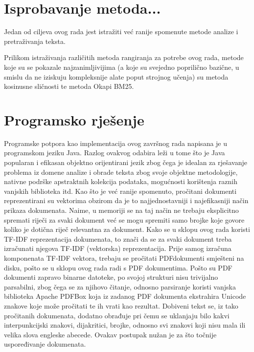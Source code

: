 \documentclass[times, utf8, zavrsni]{fer}
\begin{document}
\chapter{Isprobavanje metoda...}
Jedan od ciljeva ovog rada jest istražiti već ranije spomenute metode analize i pretraživanja teksta.

Prilikom istraživanja različitih metoda rangiranja za potrebe ovog rada, metode koje su se pokazale najzanimljivijima (a koje su svejedno poprilično bazične, u smislu da ne iziskuju kompleksnije alate poput strojnog učenja) su metoda kosinusne sličnosti te metoda Okapi BM25.

\chapter{Programsko rješenje}
\label{chap:impl}
Programske potpora kao implementacija ovog završnog rada napisana je u programskom jeziku Java. Razlog ovakvog odabira leži u tome što je Java popularan i efikasan objektno orijentirani jezik zbog čega je idealan za rješavanje problema iz domene analize i obrade teksta zbog svoje objektne metodologije, nativne podrške apstraktnih kolekcija podataka, mogućnosti korištenja raznih vanjskih biblioteka itd. \newline \newline
Kao što je već ranije spomenuto, pročitani dokumenti reprezentirani su vektorima obzirom da je to najjednostavniji i najefikasniji način prikaza dokumenata. Naime, u memoriji se na taj način ne trebaju eksplicitno spremati riječi za svaki dokument već se mogu spremiti samo brojke koje govore koliko je dotična riječ relevantna za dokument. Kako se u sklopu ovog rada koristi TF-IDF reprezentacija dokumenata, to znači da se za svaki dokument treba izračunati njegova TF-IDF (vektorska) reprezentacija. Prije samog izračuna komponenata TF-IDF vektora, trebaju se pročitati PDFdokumenti smješteni na disku, pošto se u sklopu ovog rada radi s PDF dokumentima. Pošto su PDF dokumenti zapravo binarne datoteke, po svojoj strukturi nisu trivijalno parsabilni, zbog čega se za njihovo čitanje, odnosno parsiranje koristi vanjska biblioteka Apache PDFBox koja iz zadanog PDF dokumenta ekstrahira Unicode znakove koje može pročitati te ih vrati kao rezultat. Dobiveni tekst se, iz tako pročitanih dokumenata, dodatno obrađuje pri čemu se uklanjaju bilo kakvi interpunkcijski znakovi, dijakritici, brojke, odnosno svi znakovi koji nisu mala ili velika slova engleske abecede. Ovakav postupak nužan je za što točnije uspoređivanje dokumenata.
\end{document}
